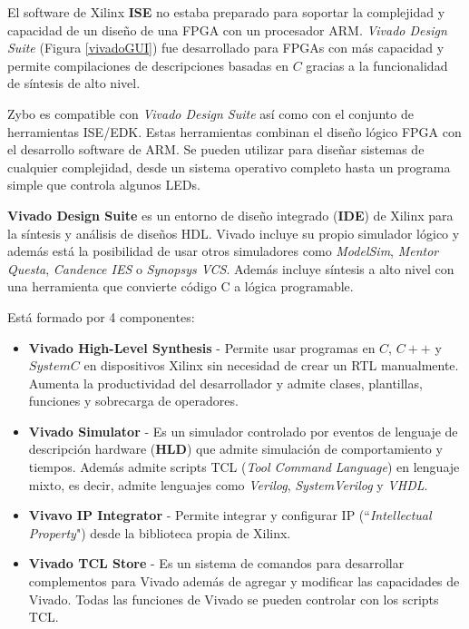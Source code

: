 El software de Xilinx \textbf{ISE} no estaba preparado para soportar la complejidad y capacidad de un diseño de una FPGA con un procesador 
ARM. \textit{Vivado Design Suite} (Figura \ref{vivadoGUI}) fue desarrollado para FPGAs con más capacidad y permite compilaciones de descripciones 
basadas en \(C\) gracias a la funcionalidad de síntesis de alto nivel.

Zybo es compatible con \textit{Vivado Design Suite} así como con el conjunto de herramientas ISE/EDK.
Estas herramientas combinan el diseño lógico FPGA con el desarrollo software de ARM. Se pueden utilizar para diseñar sistemas 
de cualquier complejidad, desde un sistema operativo completo hasta un programa simple que controla algunos LEDs.

\textbf{Vivado Design Suite} es un entorno de diseño integrado (\textbf{IDE}) de Xilinx para la síntesis y análisis de diseños HDL. Vivado incluye 
su propio simulador lógico y además está la posibilidad de usar otros simuladores como \textit{ModelSim}, \textit{Mentor Questa}, 
\textit{Candence IES} o \textit{Synopsys VCS}. Además incluye síntesis a alto nivel con una herramienta que convierte código C a lógica
 programable.

Está formado por 4 componentes:
\begin{itemize}
    \item \textbf{Vivado High-Level Synthesis} - Permite usar programas en \(C\), \(C++\) y \(SystemC\) en dispositivos Xilinx  sin necesidad 
    de crear un RTL manualmente. Aumenta la productividad del desarrollador y admite clases, plantillas, funciones y sobrecarga de operadores.
    \item \textbf{Vivado Simulator} - Es un simulador controlado por eventos de lenguaje de descripción hardware (\textbf{HLD}) que admite 
    simulación de comportamiento y tiempos. Además admite scripts TCL (\textit{Tool Command Language}) en lenguaje mixto, es decir, admite
     lenguajes como \textit{Verilog}, \textit{SystemVerilog} y \textit{VHDL}.
    \item \textbf{Vivavo IP Integrator} - Permite integrar y  configurar IP (``\textit{Intellectual Property}") desde la biblioteca propia de Xilinx.
    \item \textbf{Vivado TCL Store} - Es un sistema de comandos para desarrollar complementos para Vivado además de agregar y modificar las 
    capacidades de Vivado. Todas las funciones de Vivado se pueden controlar con los scripts TCL.
\end{itemize}

